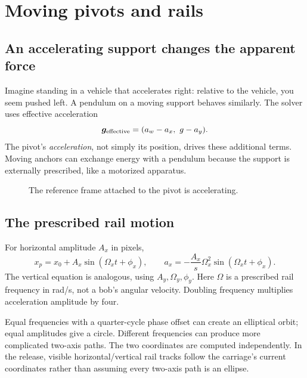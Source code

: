 \documentclass[11pt,a4paper]{article}
\begin{document}
\section{Moving pivots and rails}
\subsection{An accelerating support changes the apparent force}
Imagine standing in a vehicle that accelerates right: relative to the vehicle, you seem pushed left. A pendulum on a moving support behaves similarly. The solver uses effective acceleration
\[
 \vect g_{\rm effective}=(a_w-a_x,\ g-a_y).
\]
The pivot's \emph{acceleration}, not simply its position, drives these additional terms. Moving anchors can exchange energy with a pendulum because the support is externally prescribed, like a motorized apparatus.
\begin{figure}[H]\centering
{}\caption{The reference frame attached to the pivot is accelerating.}
\end{figure}
\subsection{The prescribed rail motion}
For horizontal amplitude \(A_x\) in pixels,
\[
 x_p=x_0+A_x\sin(\Omega_x t+\phi_x),\qquad
 a_x=-\frac{A_x}{s}\Omega_x^2\sin(\Omega_x t+\phi_x).
\]
The vertical equation is analogous, using \(A_y,\Omega_y,\phi_y\). Here \(\Omega\) is a prescribed rail frequency in rad/s, not a bob's angular velocity. Doubling frequency multiplies acceleration amplitude by four.

Equal frequencies with a quarter-cycle phase offset can create an elliptical orbit; equal amplitudes give a circle. Different frequencies can produce more complicated two-axis paths. The two coordinates are computed independently. In the release, visible horizontal/vertical rail tracks follow the carriage's current coordinates rather than assuming every two-axis path is an ellipse.
\end{document}
